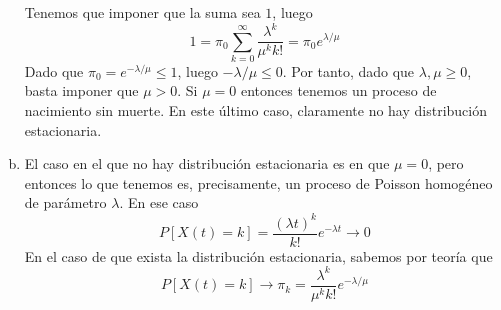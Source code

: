 \documentclass[twoside]{article}
\begin{document}
\begin{solucion}
\begin{enumerate}[a)]
$$$$
Tenemos que imponer que la suma sea $1$, luego
$$
1 =  \pi_0 \sum_{k=0}^\infty \frac{\lambda^k}{\mu^k k!} = \pi_0 e^{\lambda/\mu}
$$
Dado que $\pi_0  = e^{-\lambda / \mu}\leq 1$, luego $-\lambda/\mu \leq 0$. Por tanto, dado que $\lambda,\mu \geq 0$, basta imponer que $\mu >0$. Si $\mu = 0$ entonces tenemos un proceso de nacimiento sin muerte. En este último caso, claramente no hay distribución estacionaria.
\item El caso en el que no hay distribución estacionaria es en que $\mu =0$, pero entonces lo que tenemos es, precisamente, un proceso de Poisson homogéneo de parámetro $\lambda$. En ese caso
$$
P[X(t)=k] = \frac{(\lambda t)^k}{k!}e^{-\lambda t} \rightarrow 0
$$
En el caso de que exista la distribución estacionaria, sabemos por teoría que
$$
P[X(t)=k] \rightarrow \pi_k = \frac{\lambda^k}{\mu^k k!}e^{-\lambda/\mu}
$$
\end{enumerate}
\end{solucion}
\end{document}
